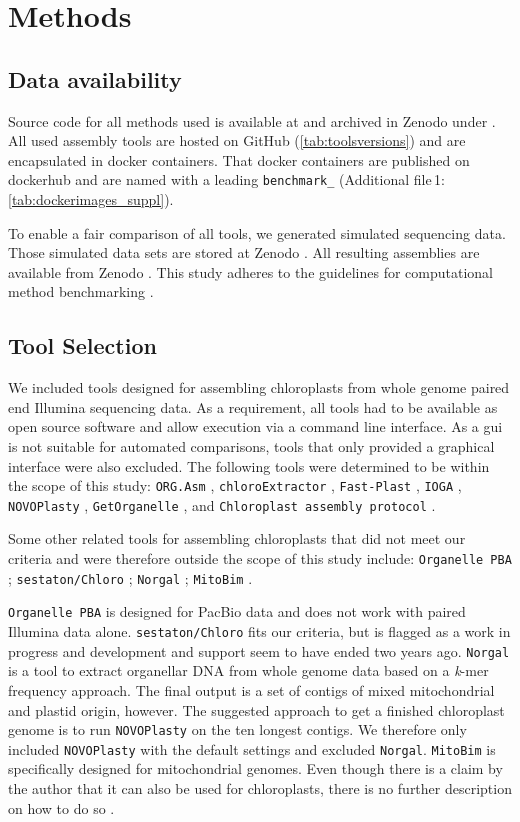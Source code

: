 \documentclass{bmcart}
\newcommand{\formatprogramnames}[1]{\texttt{#1}}
\newcommand{\ce}{\formatprogramnames{chloroExtractor}}
\newcommand{\oa}{\formatprogramnames{ORG.Asm}}
\newcommand{\fp}{\formatprogramnames{Fast-Plast}}
\newcommand{\ioga}{\formatprogramnames{IOGA}}
\newcommand{\np}{\formatprogramnames{NOVOPlasty}}
\newcommand{\go}{\formatprogramnames{GetOrganelle}}
\newcommand{\cassp}{\formatprogramnames{Chloroplast assembly protocol}}
\newcommand{\zenododataset}{\cite{zenododataset}}
\newcommand{\zenodorepo}{\cite{zenodorepo}}
\newcommand{\crefsupp}[1]{Additional file\,1: \cref{#1}}
\begin{document}
\section*{Methods}
\subsection*{Data availability}
Source code for all methods used is available at \cite{github-benchmark-repo} and archived in Zenodo under \zenodorepo{}.
All used assembly tools are hosted on GitHub (\cref{tab:toolsversions}) and are encapsulated in docker containers.
That docker containers are published on dockerhub \cite{dockerhub-benchmark} and are named with a leading \texttt{benchmark\_} (\crefsupp{tab:dockerimages_suppl}).

To enable a fair comparison of all tools, we generated simulated sequencing data.
Those simulated data sets are stored at Zenodo \zenododataset{}.
All resulting assemblies are available from Zenodo \cite{zenodoassemblies}.
This study adheres to the guidelines for computational method benchmarking \cite{weber_essential_2018}.

\subsection*{Tool Selection}
We included tools designed for assembling chloroplasts from whole genome paired end Illumina sequencing data. As a requirement, all tools had to be available as open source software and allow execution via a command line interface. 
As a \gls{gui} is not suitable for automated comparisons, tools that only provided a graphical interface were also excluded.
The following tools were determined to be within the scope of this study:
\oa{} \cite{coissac_barcodes_2016}, 
\ce{} \cite{j_ankenbrand_chloroextractor:_2018}, 
\fp{} \cite{mckain__fast-plast_2017}, 
\ioga{} \cite{bakker_herbarium_2016}, 
\np{} \cite{dierckxsens_novoplasty:_2017}, 
\go{} \cite{jin_getorganelle:_2018}, and
\cassp{} \cite{sancho_comparative_2018}.

Some other related tools for assembling chloroplasts that did not meet our criteria and were therefore outside the scope of this study include:
\texttt{Organelle PBA} \cite{Soorni2017}; \texttt{sestaton/Chloro} \cite{sestaton}; \texttt{Norgal}  \cite{Al-Nakeeb2017}; \texttt{MitoBim} \cite{mitobim2013}.

\texttt{Organelle PBA} is designed for PacBio data and does not work with paired Illumina data alone.
\texttt{sestaton/Chloro} fits our criteria, but is flagged as a work in progress and development and support seem to have ended two years ago.
\texttt{Norgal} is a tool to extract organellar DNA from whole genome data based on a \textit{k}-mer frequency approach. The final output is a set of contigs of mixed mitochondrial and plastid origin, however. The suggested approach to get a finished chloroplast genome is to run \np{} on the ten longest contigs. We therefore only included \np{} with the default settings and excluded \texttt{Norgal}.
\texttt{MitoBim} is specifically designed for mitochondrial genomes. Even though there is a claim by the author that it can also be used for chloroplasts, there is no further description on how to do so \cite{mitobim_issue16}.
\end{document}
